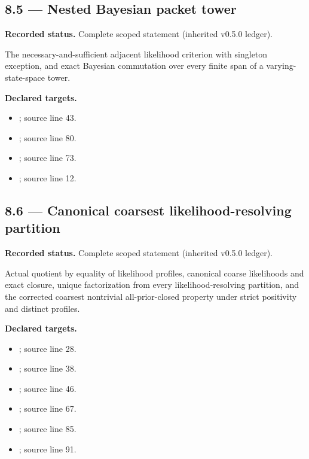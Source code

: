 \subsection{8.5 — Nested Bayesian packet tower}
\label{result:8.5}
\textbf{Recorded status.} Complete scoped statement (inherited v0.5.0 ledger).\par
The necessary-and-sufficient adjacent likelihood criterion with singleton exception, and exact Bayesian commutation over every finite span of a varying-state-space tower.

\textbf{Declared targets.}\begin{itemize}
\item {}; source line 43.
\item {}; source line 80.
\item {}; source line 73.
\item {}; source line 12.
\end{itemize}
\subsection{8.6 — Canonical coarsest likelihood-resolving partition}
\label{result:8.6}
\textbf{Recorded status.} Complete scoped statement (inherited v0.5.0 ledger).\par
Actual quotient by equality of likelihood profiles, canonical coarse likelihoods and exact closure, unique factorization from every likelihood-resolving partition, and the corrected coarsest nontrivial all-prior-closed property under strict positivity and distinct profiles.

\textbf{Declared targets.}\begin{itemize}
\item {}; source line 28.
\item {}; source line 38.
\item {}; source line 46.
\item {}; source line 67.
\item {}; source line 85.
\item {}; source line 91.
\end{itemize}
